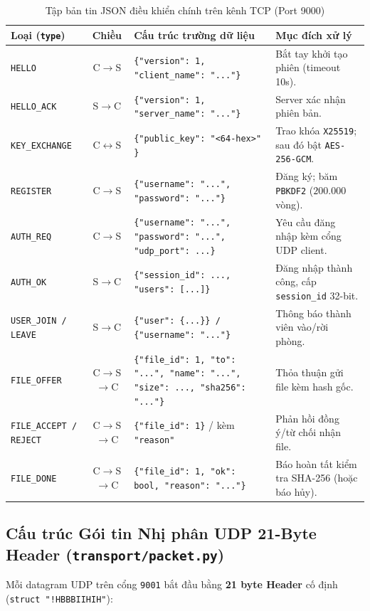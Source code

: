 \begin{table}[H]
\centering
\caption{Tập bản tin JSON điều khiển chính trên kênh TCP (Port 9000)}
\label{tab:tcp_messages}
\renewcommand{\arraystretch}{1.25}
\begin{tabularx}{\textwidth}{|l|c|X|X|}
\hline
\textbf{Loại (\texttt{type})} & \textbf{Chiều} & \textbf{Cấu trúc trường dữ liệu} & \textbf{Mục đích xử lý} \\
\hline
\texttt{HELLO} & C$\rightarrow$S & \texttt{\{"version": 1, "client\_name": "..."\}} & Bắt tay khởi tạo phiên (timeout 10s). \\
\hline
\texttt{HELLO\_ACK} & S$\rightarrow$C & \texttt{\{"version": 1, "server\_name": "..."\}} & Server xác nhận phiên bản. \\
\hline
\texttt{KEY\_EXCHANGE} & C$\leftrightarrow$S & \texttt{\{"public\_key": "<64-hex>" \}} & Trao khóa \texttt{X25519}; sau đó bật \texttt{AES-256-GCM}. \\
\hline
\texttt{REGISTER} & C$\rightarrow$S & \texttt{\{"username": "...", "password": "..."\}} & Đăng ký; băm \texttt{PBKDF2} ($200.000$ vòng). \\
\hline
\texttt{AUTH\_REQ} & C$\rightarrow$S & \texttt{\{"username": "...", "password": "...", "udp\_port": ...\}} & Yêu cầu đăng nhập kèm cổng UDP client. \\
\hline
\texttt{AUTH\_OK} & S$\rightarrow$C & \texttt{\{"session\_id": ..., "users": [...]\}} & Đăng nhập thành công, cấp \texttt{session\_id} 32-bit. \\
\hline
\texttt{USER\_JOIN / LEAVE} & S$\rightarrow$C & \texttt{\{"user": \{...\}\} / \{"username": "..."\}} & Thông báo thành viên vào/rời phòng. \\
\hline
\texttt{FILE\_OFFER} & C$\rightarrow$S$\rightarrow$C & \texttt{\{"file\_id": 1, "to": "...", "name": "...", "size": ..., "sha256": "..."\}} & Thỏa thuận gửi file kèm hash gốc. \\
\hline
\texttt{FILE\_ACCEPT / REJECT} & C$\rightarrow$S$\rightarrow$C & \texttt{\{"file\_id": 1\}} / kèm \texttt{"reason"} & Phản hồi đồng ý/từ chối nhận file. \\
\hline
\texttt{FILE\_DONE} & C$\rightarrow$S$\rightarrow$C & \texttt{\{"file\_id": 1, "ok": bool, "reason": "..."\}} & Báo hoàn tất kiểm tra SHA-256 (hoặc báo hủy). \\
\hline
\end{tabularx}
\end{table}

\subsection{Cấu trúc Gói tin Nhị phân UDP 21-Byte Header (\texttt{transport/packet.py})}
Mỗi datagram UDP trên cổng \texttt{9001} bắt đầu bằng \textbf{21 byte Header} cố định (\texttt{struct "!HBBBIIHIH"}):

